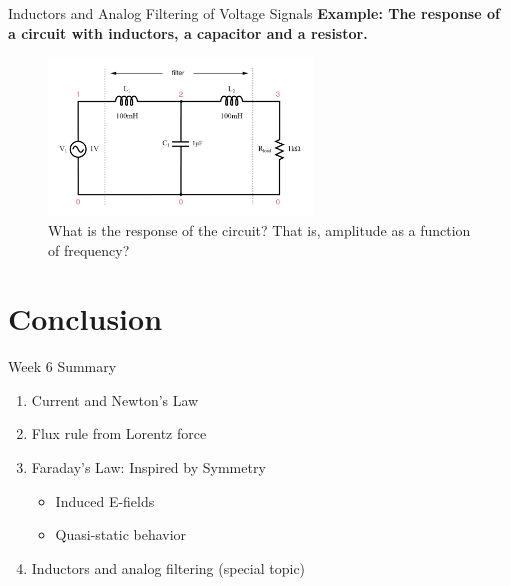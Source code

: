 \documentclass{beamer}
\begin{document}
\begin{frame}{Inductors and Analog Filtering of Voltage Signals}
\textbf{Example: The response of a circuit with inductors, a capacitor and a resistor.}
\begin{figure}
\centering
\includegraphics[width=7cm]{figures/filter.png}
\caption{\label{fig:filter} What is the response of the circuit?  That is, amplitude as a function of frequency?}
\end{figure}
\end{frame}

\section{Conclusion}

\begin{frame}{Week 6 Summary}
\begin{enumerate}
\item Current and Newton's Law
\item Flux rule from Lorentz force
\item Faraday's Law: Inspired by Symmetry
\begin{itemize}
\item Induced E-fields
\item Quasi-static behavior
\end{itemize}
\item Inductors and analog filtering (special topic)
\end{enumerate}
\end{frame}
\end{document}
